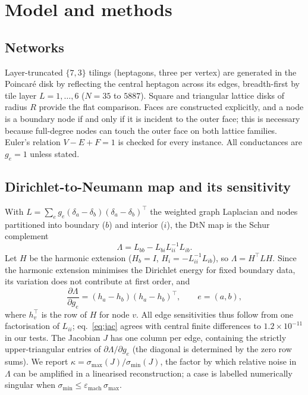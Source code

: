 \documentclass[11pt,a4paper]{article}
\begin{document}
\section{Model and methods}

\subsection{Networks}
Layer-truncated $\{7,3\}$ tilings (heptagons, three per vertex) are generated in the Poincar\'e disk by reflecting
the central heptagon across its edges, breadth-first by tile layer $L=1,\dots,6$ ($N=35$ to $5887$). Square and
triangular lattice disks of radius $R$ provide the flat comparison. Faces are constructed explicitly, and a node
is a boundary node if and only if it is incident to the outer face; this is necessary because full-degree nodes
can touch the outer face on both lattice families. Euler's relation $V-E+F=1$ is checked for every instance. All
conductances are $g_e=1$ unless stated.

\subsection{Dirichlet-to-Neumann map and its sensitivity}
With $L=\sum_e g_e (\delta_a-\delta_b)(\delta_a-\delta_b)^\top$ the weighted graph Laplacian and nodes partitioned
into boundary ($b$) and interior ($i$), the DtN map is the Schur complement
\begin{equation}
\Lambda = L_{bb} - L_{bi} L_{ii}^{-1} L_{ib}.
\end{equation}
Let $H$ be the harmonic extension ($H_{b}=I$, $H_{i}=-L_{ii}^{-1}L_{ib}$), so $\Lambda = H^\top L H$. Since the
harmonic extension minimises the Dirichlet energy for fixed boundary data, its variation does not contribute at first
order, and
\begin{equation}
\frac{\partial \Lambda}{\partial g_e} = (h_a - h_b)(h_a - h_b)^\top, \qquad e=(a,b),
\label{eq:jac}
\end{equation}
where $h_v^\top$ is the row of $H$ for node $v$. All edge sensitivities thus follow from one factorisation of
$L_{ii}$; eq.~\eqref{eq:jac} agrees with central finite differences to $1.2\times10^{-11}$ in our tests. The
Jacobian $J$ has one column per edge, containing the strictly upper-triangular entries of
$\partial\Lambda/\partial g_e$ (the diagonal is determined by the zero row sums). We report
$\kappa = \sigma_{\max}(J)/\sigma_{\min}(J)$, the factor by which relative noise in $\Lambda$ can be amplified in a
linearised reconstruction; a case is labelled numerically singular when
$\sigma_{\min}\le\varepsilon_{\mathrm{mach}}\,\sigma_{\max}$.
\end{document}
